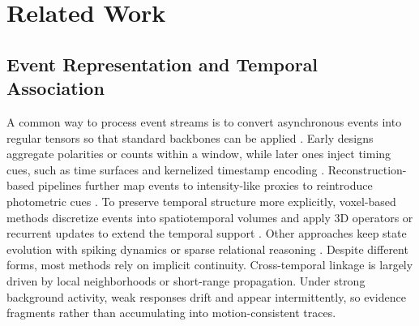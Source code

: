 \documentclass[runningheads]{llncs}
\begin{document}

\section{Related Work}

\subsection{Event Representation and Temporal Association}
A common way to process event streams is to convert asynchronous events into regular tensors so that standard backbones can be applied \cite{Maqueda2018event}.
Early designs aggregate polarities or counts within a window, while later ones inject timing cues, such as time surfaces and kernelized timestamp encoding \cite{lagorce2016hots, gehrig2019end}.
Reconstruction-based pipelines further map events to intensity-like proxies to reintroduce photometric cues \cite{rebecq2021high}.
To preserve temporal structure more explicitly, voxel-based methods discretize events into spatiotemporal volumes and apply 3D operators or recurrent updates to extend the temporal support \cite{zhu2019unsupervised, perot2020learning, gehrig2023recurrent}.
Other approaches keep state evolution with spiking dynamics or sparse relational reasoning \cite{su2023deep, zhang2022spiking, schaefer2022aegnn, bi2019graph}.
Despite different forms, most methods rely on implicit continuity.
Cross-temporal linkage is largely driven by local neighborhoods or short-range propagation.
Under strong background activity, weak responses drift and appear intermittently, so evidence fragments rather than accumulating into motion-consistent traces.
\end{document}
